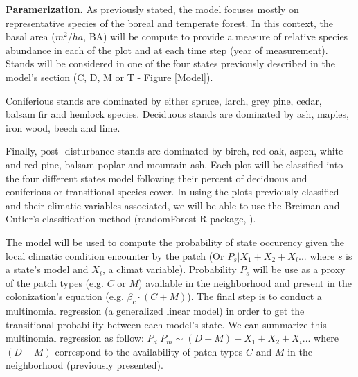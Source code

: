 

\textbf{Paramerization.} As previously stated, the model focuses mostly on
representative species of the boreal and temperate forest. In this context, the basal area ($m^2/ha$, BA) will be compute to
provide a measure of relative species abundance in each of the
plot and at each time step (year of measurement). Stands will be considered in one of the four states 
previously described in the model's
section (C, D, M or T - Figure \ref{Model}).


 Coniferious stands are dominated by either spruce, larch, grey pine, cedar,
balsam fir and hemlock species. Deciduous stands are dominated by ash, maples,
iron wood, beech and lime.


Finally, post- disturbance stands are dominated by birch, red oak, aspen,
white and red pine, balsam poplar and mountain ash. Each plot will be
classified into the four different states model following their percent of
deciduous and coniferious or transitional species cover. In using the plots
previously classified and their climatic variables associated, we will be able
to use the Breiman and Cutler's classification method (randomForest R-package,
\cite{Liaw2002a}).

%

The model will be used to compute the probability of state occurency given the
local climatic condition encounter by the patch (Or $P_{s}|X_1+X_2+X_i...$
where $s$ is a state's model and $X_i$, a climat variable). Probability $P_s$
will be use as a proxy of the patch types (e.g. $C$ or $M$) available in the
neighborhood and present in the colonization's equation (e.g. $\beta_c \cdot
(C+M)$). The final step is to conduct a multinomial regression (a generalized
linear model) in order to get the transitional probability between each
model's state. We can summarize this multinomial regression as follow:
$P_{d}|P_{m} \sim (D+M) + X_1+X_2+X_i... $ where $(D+M)$ correspond to the
availability of patch types $C$ and $M$ in the neighborhood (previously
presented).\\

